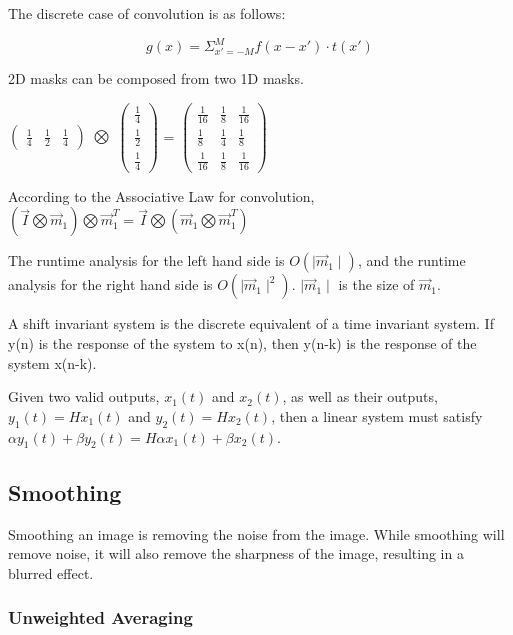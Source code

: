 \documentclass{article}
\begin{document}
\begin{multicols}{2}
The discrete case of convolution is as follows:

\[g(x) = \Sigma_{x'=-M}^{M} f(x-x') \cdot t(x')\]

2D masks can be composed from two 1D masks.

$\begin{pmatrix}
  \frac{1}{4} & \frac{1}{2} & \frac{1}{4}
\end{pmatrix}$
$\bigotimes$
$\begin{pmatrix}
  \frac{1}{4}\\
  \frac{1}{2}\\
  \frac{1}{4}
\end{pmatrix}$
=
$\begin{pmatrix}
  \frac{1}{16} & \frac{1}{8} & \frac{1}{16}\\
  \frac{1}{8} & \frac{1}{4} & \frac{1}{8}\\
  \frac{1}{16} & \frac{1}{8} & \frac{1}{16}
\end{pmatrix}$

According to the Associative Law for convolution, $(\vec I \bigotimes \vec m_1) \bigotimes \vec m_{1}^{T} = \vec I \bigotimes (\vec m_1 \bigotimes \vec m_{1}^{T})$

The runtime analysis for the left hand side is $O(\mid \vec m_1 \mid)$, and the runtime analysis for the right hand side is $O(\mid \vec m_1 \mid^2)$. $\mid \vec m_1 \mid$ is the size of $\vec m_1$.

A shift invariant system is the discrete equivalent of a time invariant system. If y(n) is the response of the system to x(n), then y(n-k) is the response of the system x(n-k).

Given two valid outputs, $x_1(t)$ and $x_2(t)$, as well as their outputs, $y_1(t) = H{x_1(t)}$ and $y_2(t) = H{x_2(t)}$, then a linear system must satisfy $\alpha y_1(t) + \beta y_2(t) = H{\alpha x_1(t) + \beta x_2(t)}$.

\subsection{Smoothing}

Smoothing an image is removing the noise from the image. While smoothing will remove noise, it will also remove the sharpness of the image, resulting in a blurred effect.

\subsubsection{Unweighted Averaging}


\end{multicols}
\end{document}
